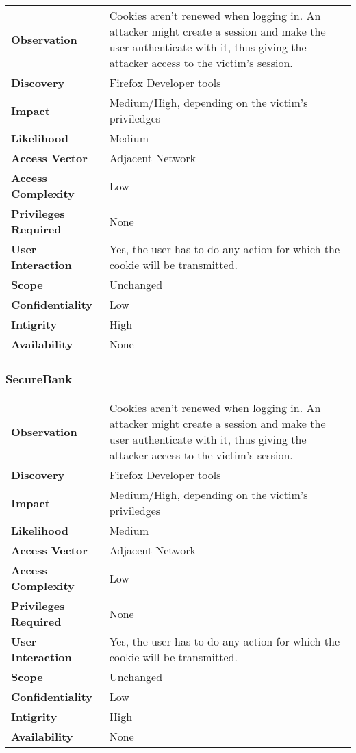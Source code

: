 \begin{tabular}{l|p{10cm}}
\textbf{Observation} & Cookies aren't renewed when logging in. An attacker might create a session and make the user authenticate with it, thus giving the attacker access to the victim's session. \\
\textbf{Discovery} & Firefox Developer tools \\
\textbf{Impact} & Medium/High, depending on the victim's priviledges \\
\textbf{Likelihood} & Medium \\
\textbf{Access Vector} & Adjacent Network \\
\textbf{Access Complexity} & Low\\
\textbf{Privileges Required} & None \\
\textbf{User Interaction} & Yes, the user has to do any action for which the cookie will be transmitted. \\
\textbf{Scope} & Unchanged \\
\textbf{Confidentiality} & Low \\
\textbf{Intigrity} & High\\
\textbf{Availability} & None \\
\end{tabular}

\subsubsection*{SecureBank}

\begin{tabular}{l|p{10cm}}
\textbf{Observation} & Cookies aren't renewed when logging in. An attacker might create a session and make the user authenticate with it, thus giving the attacker access to the victim's session. \\
\textbf{Discovery} & Firefox Developer tools \\
\textbf{Impact} & Medium/High, depending on the victim's priviledges \\
\textbf{Likelihood} & Medium \\
\textbf{Access Vector} & Adjacent Network \\
\textbf{Access Complexity} & Low\\
\textbf{Privileges Required} & None \\
\textbf{User Interaction} & Yes, the user has to do any action for which the cookie will be transmitted. \\
\textbf{Scope} & Unchanged \\
\textbf{Confidentiality} & Low \\
\textbf{Intigrity} & High\\
\textbf{Availability} & None \\
\end{tabular}

